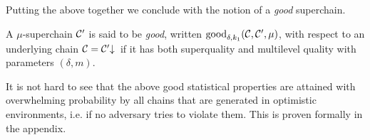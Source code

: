 
Putting the above together we conclude with the notion of a {\em good}
superchain.

\begin{definition}
\label{lem.good}
A $\mu$-superchain $\mathcal{C}'$
is said to be \textit{good}, written $\textnormal{good}_{\delta, k_1}(\mathcal{C},
\mathcal{C}', \mu)$, with respect to an underlying chain $\mathcal{C} = \mathcal{C}'\negthickspace\downarrow\,$
if it has both superquality and multilevel quality with parameters $(\delta,
m)$.
\end{definition}

It is not hard to see that the above good statistical properties are attained
with overwhelming probability by all chains that are generated in optimistic
environments, i.e. if no adversary tries to violate them. This is proven
formally in the appendix.
